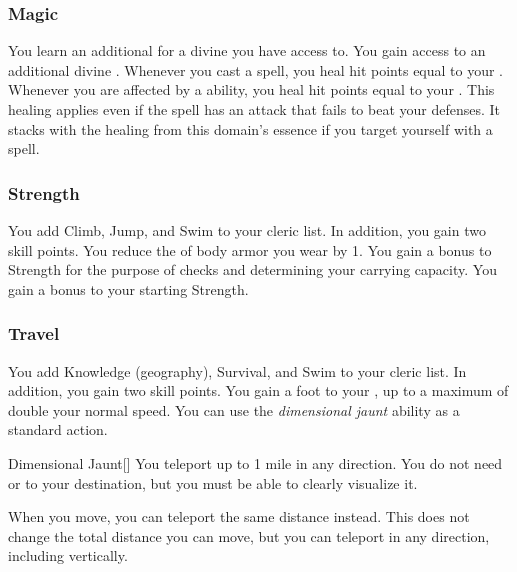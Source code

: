         \subsubsection{Magic}
             You learn an additional  for a divine  you have access to.
             You gain access to an additional divine .
             Whenever you cast a spell, you heal hit points equal to your .
             Whenever you are affected by a  ability, you heal hit points equal to your .
            This healing applies even if the spell has an attack that fails to beat your defenses.
            It stacks with the healing from this domain's essence if you target yourself with a spell.

        \subsubsection{Strength}
             You add Climb, Jump, and Swim to your cleric  list.
            In addition, you gain two skill points.
             You reduce the  of body armor you wear by 1.
             You gain a  bonus to Strength for the purpose of checks and determining your carrying capacity.
             You gain a  bonus to your starting Strength.

        \subsubsection{Travel}
             You add Knowledge (geography), Survival, and Swim to your cleric  list.
            In addition, you gain two skill points.
             You gain a  foot  to your , up to a maximum of double your normal speed.
             You can use the \textit{dimensional jaunt} ability as a standard action.
            \begin{apability}{Dimensional Jaunt}[]
                You teleport up to 1 mile in any direction.
                You do not need  or  to your destination, but you must be able to clearly visualize it.
            \end{apability}
             When you move, you can teleport the same distance instead.
            This does not change the total distance you can move, but you can teleport in any direction, including vertically.

